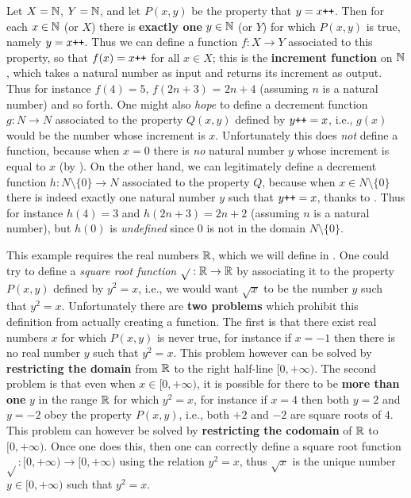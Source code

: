 \begin{example} \label{example 3.3.2}
Let \(X = \mathbb{N}\), \(Y = \mathbb{N}\), and let \(P(x, y)\) be the property that \(y = x\texttt{++}\).
Then for each \(x \in \mathbb{N}\) (or \(X\)) there is \textbf{exactly one} \(y \in \mathbb{N}\) (or \(Y\)) for which \(P(x, y)\) is true, namely \(y = x\texttt{++}\).
Thus we can define a function \(f : X \rightarrow Y\) associated to this property, so that \(f(x)= x\texttt{++}\) for all \(x \in X\); this is the \textbf{increment function} on \(\mathbb{N}\), which takes a natural number as input and returns its increment as output.
Thus for instance \(f(4) = 5\), \(f(2n + 3)\) = \(2n + 4\) (assuming \(n\) is a natural number) and so forth. One might also \emph{hope} to define a decrement function \(g : N \rightarrow N\) associated to the property \(Q(x, y)\) defined by \(y\texttt{++} = x\), i.e., \(g(x)\) would be the number whose increment is \(x\).
Unfortunately this does \emph{not} define a function, because when \(x = 0\) there is \emph{no} natural number \(y\) whose increment is equal to \(x\) (by ).
On the other hand, we can legitimately define a decrement function \(h : N \setminus \{0\} \rightarrow N\) associated to the property \(Q\), because when \(x \in N \setminus \{0\}\) there is indeed exactly one natural number \(y\) such that \(y\texttt{++} = x\), thanks to .
Thus for instance \(h(4) = 3\) and \(h(2n +3) = 2n + 2\) (assuming \(n\) is a natural number), but \(h(0)\) is \emph{undefined} since \(0\) is not in the domain \(N \setminus \{0\}\).
\end{example}

\begin{example} [Informal]
This example requires the real numbers \(\mathbb{R}\), which we will define in . 
One could try to define a \emph{square root function} \(\sqrt{} : \mathbb{R} \rightarrow \mathbb{R}\) by associating it to the property \(P(x, y)\) defined by \(y^2 = x\), i.e., we would want \(\sqrt{x}\) to be the number \(y\) such that \(y^2 = x\).
Unfortunately there are \textbf{two problems} which prohibit this definition from actually creating a function.
The first is that there exist real numbers \(x\) for which \(P(x, y)\) is never true, for instance if \(x = -1\) then there is no real number \(y\) such that \(y^2 = x\).
This problem however can be solved by \textbf{restricting the domain} from \(\mathbb{R}\) to the right half-line \([0, +\infty)\).
The second problem is that even when \(x \in [0, +\infty)\), it is possible for there to be \textbf{more than one} \(y\) in the range \(\mathbb{R}\) for which \(y^2 = x\),
for instance if \(x = 4\) then both \(y = 2\) and \(y = -2\) obey the property \(P(x, y)\), i.e., both \(+2\) and \(-2\) are square roots of \(4\).
This problem can however be solved by \textbf{restricting the codomain} of \(\mathbb{R}\) to \([0, +\infty)\).
Once one does this, then one can correctly define a square root function \(\sqrt{} :[0, +\infty) \rightarrow [0, +\infty)\) using the relation \(y^2 = x\), thus \(\sqrt{x}\) is the unique number \(y \in [0, +\infty)\) such that \(y^2 = x\).
\end{example}

